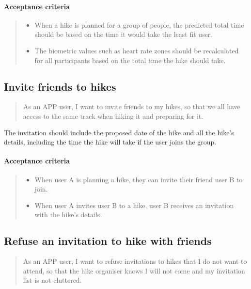 \paragraph*{Acceptance criteria}
\begin{quote}
\begin{itemize}
    \item When a hike is planned for a group of people, the predicted total time should be based on the time it would take the least fit user.
    \item The biometric values such as heart rate zones should be recalculated for all participants based on the total time the hike should take.
\end{itemize}
\end{quote}


\subsection{Invite friends to hikes}\label{US:friends-invite}
\begin{quote}
As an APP user, I want to invite friends to my hikes, so that we all have access to the same track when hiking it and preparing for it.
\end{quote}

The invitation should include the proposed date of the hike and all the hike's details, including the time the hike will take if the user joins the group.

\paragraph*{Acceptance criteria}
\begin{quote}
\begin{itemize}
    \item When user A is planning a hike, they can invite their friend user B to join. 
    \item When user A invites user B to a hike, user B receives an invitation with the hike's details.
\end{itemize}
\end{quote}

\subsection{Refuse an invitation to hike with friends}\label{US:friends-invite-refuse}
\begin{quote}
As an APP user, I want to refuse invitations to hikes that I do not want to attend, so that the hike organiser knows I will not come and my invitation list is not cluttered.
\end{quote}

